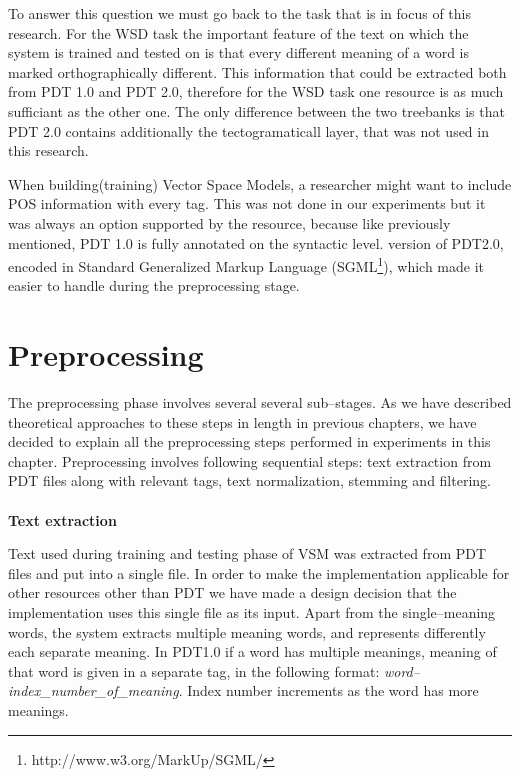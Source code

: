 To answer this question we must go back to the task that is in focus of this research. For the WSD task the 
important feature of the text on which the system is trained and tested on is that every different meaning of a 
word is marked orthographically different. This information that could be extracted both from PDT 1.0 and 
PDT 2.0, therefore for the WSD task one resource is as much sufficiant as the other one. The only 
difference between the two treebanks is that PDT 2.0 contains additionally the tectogramaticall layer, that 
was not used in this research.  

When building(training) Vector Space Models, a researcher might want to include POS information with 
every tag. This was not done in our experiments but it was always an option supported by the resource, 
because like previously mentioned, PDT 1.0 is fully annotated on the syntactic level. 
version of PDT2.0, encoded in Standard Generalized Markup Language (SGML\footnote{http://www.w3.org/MarkUp/SGML/}), 
which made it easier to handle during the preprocessing stage.

\section{Preprocessing}
The preprocessing phase involves several several sub--stages. As we have described theoretical approaches to these steps in 
length in previous chapters, we have decided to explain all the preprocessing steps performed in experiments in this chapter. 
Preprocessing involves following sequential steps: text extraction from PDT files along with relevant tags, text normalization, 
stemming and filtering. 
\\\\  \textbf{Text extraction}

Text used during training and testing phase of VSM was extracted from PDT files and put into a single file. 
In order to make the implementation applicable for other resources other than PDT we have made a 
design decision that the implementation uses this single file as its input. Apart from the single--meaning 
words, the system extracts multiple meaning words, and represents differently each separate meaning. In 
PDT1.0 if a word has multiple meanings, meaning of that word is given in a separate tag, in the following format: 
\textit{word--index\_number\_of\_meaning}. Index number increments as the word has more meanings.

